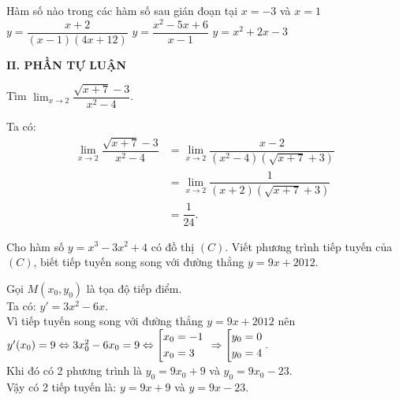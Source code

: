 \begin{ex}%
Hàm số nào trong các hàm số sau gián đoạn tại $ x = -3 $ và $ x = 1 $
	{$y=\dfrac{x+2}{(x-1)(4x+12)}$}
	{$y=\dfrac{x^2-5x+6}{x-1}$}
	{$ y = x^2 + 2x -3$}
\end{ex}




\noindent\textbf{II. PHẦN TỰ LUẬN}
\begin{bt}%

		Tìm $\displaystyle\lim_{x\to 2}\dfrac{\sqrt{x+7}-3}{x^2-4}$.
	


	\loigiai
	{ 
		Ta có:
			$$\begin{aligned}
			\displaystyle\lim_{x\to 2}\dfrac{\sqrt{x+7}-3}{x^2-4} &=\displaystyle\lim_{x\to2}\dfrac{x-2}{(x^2-4)(\sqrt{x+7} +3)} \\
			&=\displaystyle\lim_{x\to 2}\dfrac{1}{(x+2)(\sqrt{x+7} +3)}\\
			&= \dfrac{1}{24}.
			\end{aligned}$$

	
	
	}
\begin{bt}%

	 Cho hàm số $ y = x^3 - 3x^2 + 4 $ có đồ thị $ (C) $. Viết phương trình tiếp tuyến của $ (C) $, biết tiếp tuyến song song với đường thẳng $  y = 9x + 2012. $
	
	
	\loigiai
	{
		 Gọi $ M (x_0,y_0) $ là tọa độ tiếp điểm.\\
		 Ta có: $ y' = 3x^2 - 6x. $\\
			Vì tiếp tuyến song song với đường thẳng $ y = 9x + 2012 $ nên \\
			$
			y'(x_0) = 9 
			\Leftrightarrow 3x_0^2 - 6x_0 = 9
			\Leftrightarrow \left[\begin{aligned}&x_0=-1\\&x_0=3\end{aligned}\right.\
			\Rightarrow\left[\begin{aligned}&y_0=0\\&y_0=4\end{aligned}\right..
		$\\
		Khi đó có 2 phương trình là $ y_0 = 9x_0 + 9   $ và $ y_0 = 9x_0 -23. $\\
			Vậy có 2 tiếp tuyến là: $ y = 9x + 9 $ và $ y = 9x - 23 .$
		
}
\end{bt}
\end{bt}
